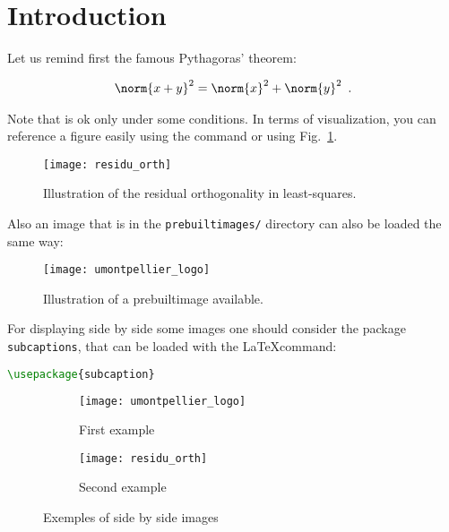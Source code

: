 

\section{Introduction}
\label{sec:introduction}

Let us remind first the famous Pythagoras' theorem:

\begin{align}\label{eq:pythagore}
	\norm{x+y}^2 = \norm{x}^2 + \norm{y}^2 \enspace.
\end{align}

Note that  is ok only under some conditions.
In terms of visualization, you can reference a figure easily using the command  or using Fig.~\ref{fig:pythagore}.

\begin{figure}[h] %
	\centering
	\texttt{[image: residu\_orth]}
	\caption{Illustration of the residual orthogonality in least-squares.}
	\label{fig:pythagore}
\end{figure}


Also an image that is in the \texttt{prebuiltimages/} directory can also be loaded the same way:

\begin{figure}[h] %
	\centering
	\texttt{[image: umontpellier\_logo]}
	\caption{Illustration of a prebuiltimage available.}
	\label{fig:umontpellier_logo}
\end{figure}


For displaying side by side some images one should consider the package \lstinline+subcaptions+, that can be loaded with the \LaTeX command:

\begin{lstlisting}[language=tex]
\usepackage{subcaption}
\end{lstlisting}


\begin{figure}[t] %
    \centering
    \begin{subfigure}[b]{0.33\textwidth}
    	\centering
        \texttt{[image: umontpellier\_logo]}%
        \caption{First example}
        \label{subfig:pythagore}
    \end{subfigure}
    \begin{subfigure}[b]{0.56\textwidth}
    	\centering
        \texttt{[image: residu\_orth]}%
        \caption{Second example}
        \label{subfig:logo}
    \end{subfigure}
    \caption{Exemples of side by side images}
    \label{fig:double_example}
\end{figure}

